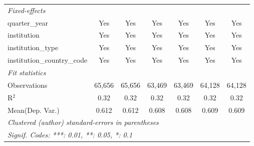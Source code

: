 \begin{tabular}{lcccccc}
   \midrule
   \emph{Fixed-effects}\\
   quarter\_year                      & Yes     & Yes         & Yes          & Yes            & Yes     & Yes\\  
   institution                        & Yes     & Yes         & Yes          & Yes            & Yes     & Yes\\  
   institution\_type                  & Yes     & Yes         & Yes          & Yes            & Yes     & Yes\\  
   institution\_country\_code         & Yes     & Yes         & Yes          & Yes            & Yes     & Yes\\  
   \midrule
   \emph{Fit statistics}\\
   Observations                       & 65,656  & 65,656      & 63,469       & 63,469         & 64,128  & 64,128\\  
   R$^2$                              & 0.32    & 0.32        & 0.32         & 0.32           & 0.32    & 0.32\\  
Mean(Dep. Var.) & 0.612 & 0.612 & 0.608 & 0.608 & 0.609 & 0.609 \\
   \midrule \midrule
   \multicolumn{7}{l}{\emph{Clustered (author) standard-errors in parentheses}}\\
   \multicolumn{7}{l}{\emph{Signif. Codes: ***: 0.01, **: 0.05, *: 0.1}}\\
\end{tabular}
\par\endgroup
